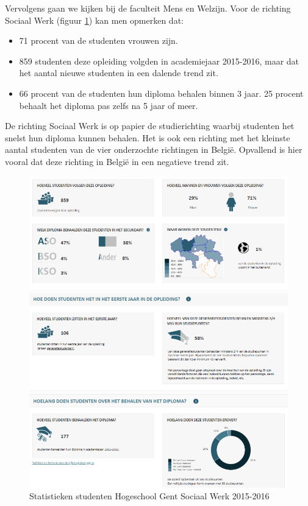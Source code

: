 Vervolgens gaan we kijken bij de faculteit Mens en Welzijn. Voor de richting Sociaal Werk (figuur \ref{fig:vlaanderensw}) kan men opmerken dat:
\begin{itemize}
	\item 71 procent van de studenten vrouwen zijn.
	\item 859 studenten deze opleiding volgden in academiejaar 2015-2016, maar dat het aantal nieuwe studenten in een dalende trend zit.
	\item 66 procent van de studenten hun diploma behalen binnen 3 jaar. 25 procent behaalt het diploma pas zelfs na 5 jaar of meer.
\end{itemize}

De richting Sociaal Werk is op papier de studierichting waarbij studenten het snelst hun diploma kunnen behalen. Het is ook een richting met het kleinste aantal studenten van de vier onderzochte richtingen in België. Opvallend is hier vooral dat deze richting in België in een negatieve trend zit.

\begin{figure}
	\includegraphics[width=\textwidth]
	{img/vlaanderen_sw.png}
	\caption{Statistieken studenten Hogeschool Gent Sociaal Werk 2015-2016
		\autocite{Onderwijs.vlaanderen.be2017}}
	\label{fig:vlaanderensw}
\end{figure}

